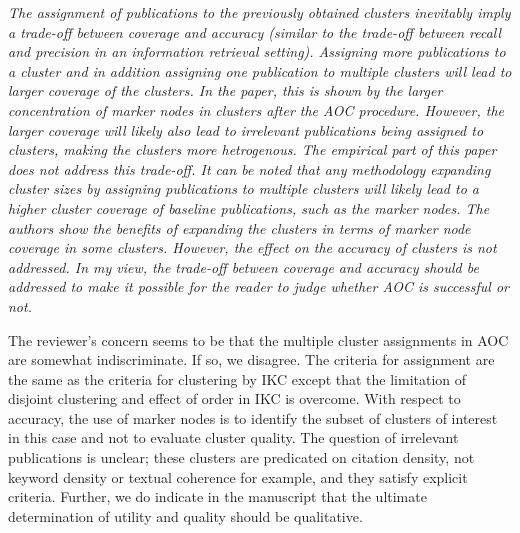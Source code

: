 \documentclass[11pt, oneside]{article}   	%
\begin{document}
 \vspace{2 mm}  
 \emph{The assignment of publications to the previously obtained clusters inevitably imply a trade-off between coverage and accuracy (similar to the trade-off between recall and precision in an information retrieval setting). Assigning more publications to a cluster and in addition assigning one publication to multiple clusters will lead to larger coverage of the clusters. In the paper, this is shown by the larger concentration of marker nodes in clusters after the AOC procedure. However, the larger coverage will likely also lead to irrelevant publications being assigned to clusters, making the clusters more hetrogenous. The empirical part of this paper does not address this trade-off. It can be noted that any methodology expanding cluster sizes by assigning publications to multiple clusters will likely lead to a higher cluster coverage of baseline publications, such as the marker nodes. The authors show the benefits of expanding the clusters in terms of marker node coverage in some clusters. However, the effect on the accuracy of clusters is not addressed. In my view, the trade-off between coverage and accuracy should be addressed to make it possible for the reader to judge whether AOC is successful or not.}

\vspace{2 mm} The reviewer's concern seems to be that the multiple cluster assignments in AOC are somewhat indiscriminate. If so, we disagree. The criteria for assignment are the same as the criteria for clustering by IKC except that the limitation of disjoint clustering and effect of order in IKC is overcome. With respect to accuracy, the  use of marker nodes is to identify the subset of clusters of interest in this case and not to evaluate cluster quality. The question of irrelevant publications is unclear; these clusters are predicated on citation density, not keyword density or textual coherence for example, and they satisfy explicit criteria. Further, we do indicate in the manuscript that the ultimate determination of utility and quality should be qualitative. 
\end{document}
